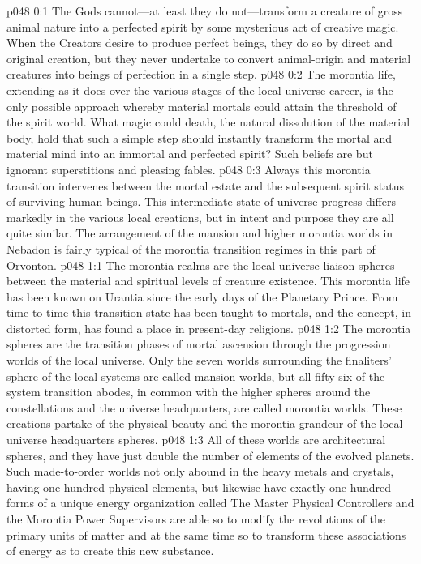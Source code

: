 \author{Archangel}
\vs p048 0:1 The Gods cannot---at least they do not---transform a creature of gross animal nature into a perfected spirit by some mysterious act of creative magic. When the Creators desire to produce perfect beings, they do so by direct and original creation, but they never undertake to convert animal\hyp{}origin and material creatures into beings of perfection in a single step.
\vs p048 0:2 The morontia life, extending as it does over the various stages of the local universe career, is the only possible approach whereby material mortals could attain the threshold of the spirit world. What magic could death, the natural dissolution of the material body, hold that such a simple step should instantly transform the mortal and material mind into an immortal and perfected spirit? Such beliefs are but ignorant superstitions and pleasing fables.
\vs p048 0:3 Always this morontia transition intervenes between the mortal estate and the subsequent spirit status of surviving human beings. This intermediate state of universe progress differs markedly in the various local creations, but in intent and purpose they are all quite similar. The arrangement of the mansion and higher morontia worlds in Nebadon is fairly typical of the morontia transition regimes in this part of Orvonton.
\vs p048 1:1 The morontia realms are the local universe liaison spheres between the material and spiritual levels of creature existence. This morontia life has been known on Urantia since the early days of the Planetary Prince. From time to time this transition state has been taught to mortals, and the concept, in distorted form, has found a place in present\hyp{}day religions.
\vs p048 1:2 The morontia spheres are the transition phases of mortal ascension through the progression worlds of the local universe. Only the seven worlds surrounding the finaliters’ sphere of the local systems are called mansion worlds, but all fifty\hyp{}six of the system transition abodes, in common with the higher spheres around the constellations and the universe headquarters, are called morontia worlds. These creations partake of the physical beauty and the morontia grandeur of the local universe headquarters spheres.
\vs p048 1:3 All of these worlds are architectural spheres, and they have just double the number of elements of the evolved planets. Such made\hyp{}to\hyp{}order worlds not only abound in the heavy metals and crystals, having one hundred physical elements, but likewise have exactly one hundred forms of a unique energy organization called  The Master Physical Controllers and the Morontia Power Supervisors are able so to modify the revolutions of the primary units of matter and at the same time so to transform these associations of energy as to create this new substance.\plusone
